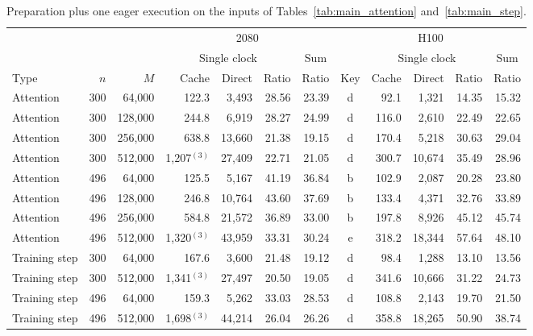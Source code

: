 \begin{table}[!htbp]
\caption{Preparation plus one eager execution on the inputs of Tables~\ref{tab:main_attention} and~\ref{tab:main_step}.}
\label{tab:totals}
\footnotesize
\setlength{\tabcolsep}{2.5pt}
\begin{tabular}{lrr rrrr crrrr}
\toprule
 &  &  & \multicolumn{4}{c}{2080} & \multicolumn{5}{c}{H100} \\
\cmidrule(lr){4-7} \cmidrule(lr){8-12}
 &  &  & \multicolumn{3}{c}{Single clock} & \multicolumn{1}{c}{Sum} &  & \multicolumn{3}{c}{Single clock} & \multicolumn{1}{c}{Sum} \\
\cmidrule(lr){4-6} \cmidrule(lr){7-7} \cmidrule(lr){9-11} \cmidrule(lr){12-12}
Type & $n$ & $M$ & Cache & Direct & Ratio & Ratio & Key & Cache & Direct & Ratio & Ratio \\
\midrule
Attention & 300 & 64,000 & 122.3 & 3,493 & 28.56 & 23.39 & d & 92.1 & 1,321 & 14.35 & 15.32 \\
Attention & 300 & 128,000 & 244.8 & 6,919 & 28.27 & 24.99 & d & 116.0 & 2,610 & 22.49 & 22.65 \\
Attention & 300 & 256,000 & 638.8 & 13,660 & 21.38 & 19.15 & d & 170.4 & 5,218 & 30.63 & 29.04 \\
Attention & 300 & 512,000 & 1,207$^{(3)}$ & 27,409 & 22.71 & 21.05 & d & 300.7 & 10,674 & 35.49 & 28.96 \\
Attention & 496 & 64,000 & 125.5 & 5,167 & 41.19 & 36.84 & b & 102.9 & 2,087 & 20.28 & 23.80 \\
Attention & 496 & 128,000 & 246.8 & 10,764 & 43.60 & 37.69 & b & 133.4 & 4,371 & 32.76 & 33.89 \\
Attention & 496 & 256,000 & 584.8 & 21,572 & 36.89 & 33.00 & b & 197.8 & 8,926 & 45.12 & 45.74 \\
Attention & 496 & 512,000 & 1,320$^{(3)}$ & 43,959 & 33.31 & 30.24 & e & 318.2 & 18,344 & 57.64 & 48.10 \\
Training step & 300 & 64,000 & 167.6 & 3,600 & 21.48 & 19.12 & d & 98.4 & 1,288 & 13.10 & 13.56 \\
Training step & 300 & 512,000 & 1,341$^{(3)}$ & 27,497 & 20.50 & 19.05 & d & 341.6 & 10,666 & 31.22 & 24.73 \\
Training step & 496 & 64,000 & 159.3 & 5,262 & 33.03 & 28.53 & d & 108.8 & 2,143 & 19.70 & 21.50 \\
Training step & 496 & 512,000 & 1,698$^{(3)}$ & 44,214 & 26.04 & 26.26 & d & 358.8 & 18,265 & 50.90 & 38.74 \\
\bottomrule
\end{tabular}
\end{table}